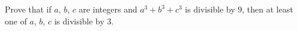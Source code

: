 Prove that if $a$, $b$, $c$ are integers and $a^3+b^3+c^3$ is divisible by $9$, then at least one of $a$, $b$, $c$ is divisible by $3$.
